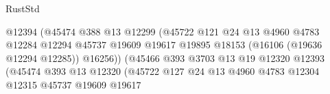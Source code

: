 \begin{lexlean}{RustStd}
\begin{coremodule}
                                                    @12394
                                                    (@45474
                                                      @388
                                                      @13
                                                      @12299
                                                      (@45722
                                                        @121
                                                        @24
                                                        @13
                                                        @4960
                                                        @4783
                                                        @12284
                                                        @12294
                                                        @45737
                                                        @19609
                                                        @19617
                                                        @19895
                                                        @18153
                                                        (@16106 (@19636 @12294 @12285))
                                                        @16256))
                                                    (@45466
                                                      @393
                                                      @3703
                                                      @13
                                                      @19
                                                      @12320
                                                      @12393
                                                      (@45474
                                                        @393
                                                        @13
                                                        @12320
                                                        (@45722
                                                          @127
                                                          @24
                                                          @13
                                                          @4960
                                                          @4783
                                                          @12304
                                                          @12315
                                                          @45737
                                                          @19609
                                                          @19617

\end{coremodule}
\end{lexlean}
